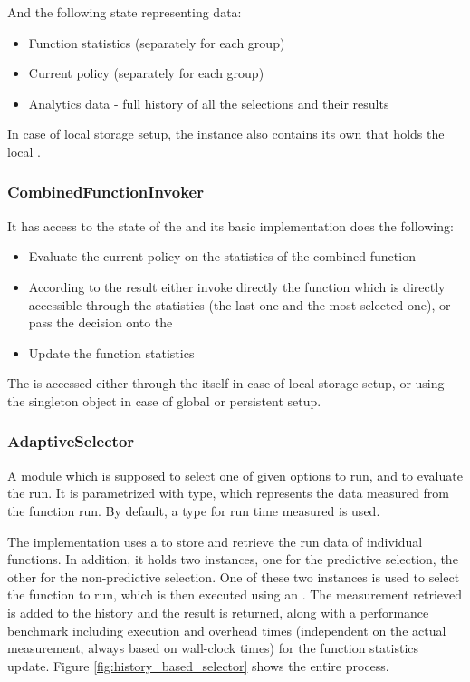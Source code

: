 And the following state representing data:

\begin{itemize}
	\item Function statistics (separately for each group)
	\item Current policy (separately for each group)
	\item Analytics data - full history of all the selections and their results
\end{itemize}

In case of local storage setup, the instance also contains its own  that holds the local .

\subsubsection{CombinedFunctionInvoker}

It has access to the state of the  and its basic implementation does the following:

\begin{itemize}
	\item Evaluate the current policy on the statistics of the combined function
	\item According to the result either invoke directly the function which is directly accessible through the statistics (the last one and the most selected one), or pass the decision onto the 
	\item Update the function statistics
\end{itemize}

The  is accessed either through the  itself in case of local storage setup, or using the singleton object  in case of global or persistent setup.

\subsubsection{AdaptiveSelector}

A module which is supposed to select one of given options to run, and to evaluate the run. It is parametrized with  type, which represents the data measured from the function run. By default, a  type for run time measured is used.

The implementation  uses a  to store and retrieve the run data of individual functions. In addition, it holds two  instances, one for the predictive selection, the other for the non-predictive selection. One of these two instances is used to select the function to run, which is then executed using an . The measurement retrieved is added to the history and the result is returned, along with a performance benchmark including execution and overhead times (independent on the actual measurement, always based on wall-clock times) for the function statistics update. Figure \ref{fig:history_based_selector} shows the entire process.


